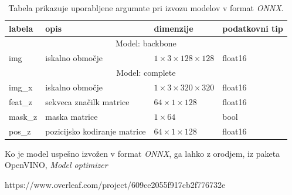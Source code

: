 \documentclass[a4paper,12pt,openright]{book}
\begin{document}
\begin{table}[htb]
    \begin{tabular}{p{}|p{}|p{}|p{}}    %
        {\bf labela } & {\bf opis}                   & {\bf dimenzije}                      & {\bf podatkovni tip} \\ \hline
        \multicolumn{4}{c}{Model: backbone}                                                                        \\
        \hline
        img           & iskalno območje              & $ 1 \times 3 \times 128 \times 128 $ & float16              \\
        \hline
        \multicolumn{4}{c}{Model: complete}                                                                        \\
        \hline
        img\_x        & iskalno območje              & $ 1 \times 3 \times 320 \times 320 $ & float16              \\
        feat\_z       & sekveca značilk matrice      & $ 64 \times 1 \times 128 $           & float16              \\
        mask\_z       & maska matrice                & $ 1 \times 64  $                     & bool                 \\
        pos\_z        & pozicijsko kodiranje matrice & $ 64 \times 1 \times 128 $           & float16              \\
    \end{tabular}
    \caption{Tabela prikazuje uporabljene argumnte pri izvozu modelov v format \emph{ONNX}.}
    \label{tab:onnx}
\end{table}



Ko je model uspešno izvožen v format \emph{ONNX}, ga lahko z orodjem, iz paketa OpenVINO, \emph{Model optimizer}



\printbibliography[heading=bibintoc,type=article,title={Članki v revijah}]
https://www.overleaf.com/project/609ce2055f917cb2f776732e
\printbibliography[heading=bibintoc,type=inproceedings,title={Članki v zbornikih}]

\printbibliography[heading=bibintoc,type=incollection,title={Poglavja v knjigah}]

\printbibliography[heading=bibintoc,title={Celotna literatura}]
\end{document}
